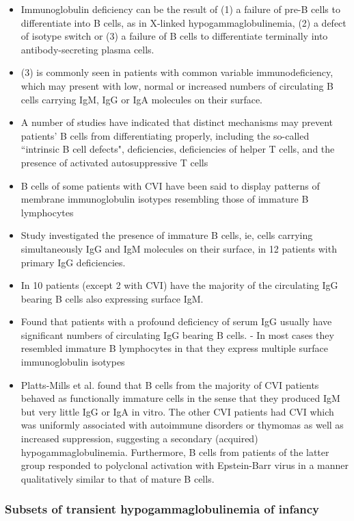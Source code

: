 \documentclass[12pt]{article}
\begin{document}
	\begin{itemize}
		\item Immunoglobulin deficiency can be the result of (1) a failure of pre-B cells to differentiate into B cells, as in X-linked hypogammaglobulinemia, (2) a defect of isotype switch or (3) a failure of B cells to differentiate terminally into antibody-secreting plasma cells.
		\item (3) is commonly seen in patients with common variable immunodeficiency, which may present with low, normal or increased numbers of circulating B cells carrying IgM, IgG or IgA molecules on their surface.
		\item A number of studies have indicated that distinct mechanisms may prevent patients' B cells from differentiating properly, including the so-called ``intrinsic B cell defects", deficiencies, deficiencies of helper T cells, and the presence of activated autosuppressive T cells
		\item B cells of some patients with CVI have been said to display patterns of membrane immunoglobulin isotypes resembling those of immature B lymphocytes
		\item Study investigated the presence of immature B cells, ie, cells carrying simultaneously IgG and IgM molecules on their surface, in 12 patients with primary IgG deficiencies. 
		\item In 10 patients (except 2 with CVI) have the majority of the circulating IgG bearing B cells also expressing surface IgM. 
		\item Found that patients with a profound deficiency of serum IgG usually have significant numbers of circulating IgG bearing B cells. - In most cases they resembled immature B lymphocytes in that they express multiple surface immunoglobulin isotypes
		\item Platts-Mills et al. found that B cells from the majority of CVI patients behaved as functionally immature cells in the sense that they produced IgM but very little IgG or IgA in vitro. The other CVI patients had CVI which was uniformly associated with autoimmune disorders or thymomas as well as increased suppression, suggesting a secondary (acquired) hypogammaglobulinemia. Furthermore, B cells from patients of the latter group responded to polyclonal activation with Epstein-Barr virus in a manner qualitatively similar to that of mature B cells. 
	\end{itemize}
	
	\subsubsection{Subsets of transient hypogammaglobulinemia of infancy \citeauthor{Dalal98} \citeyear{Dalal98}}
	
\end{document}
